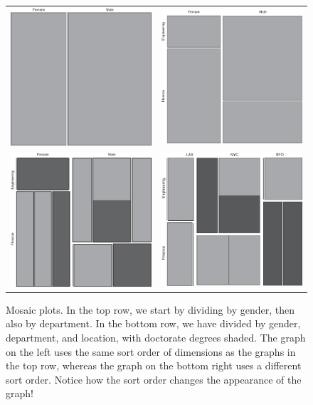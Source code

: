 \begin{figure}
  \begin{tabular}{@{\hskip-12pt}cc}
    \includegraphics[width=2.5in]{img/mosaic1} &
    \includegraphics[width=2.5in]{img/mosaic2} \\[6pt]
    \includegraphics[width=2.5in]{img/mosaic3} &
    \includegraphics[width=2.5in]{img/mosaic4} 
  \end{tabular}
  \caption{Mosaic plots. In the top row, we start by dividing by 
    gender, then also by department. In the bottom row, we have
    divided by gender, department, and location, with doctorate
    degrees shaded. The graph on the left uses the same sort order
    of dimensions as the graphs in the top row, whereas the graph
    on the bottom right uses a different sort order. Notice how
    the sort order changes the appearance of the graph!}
  \label{fig:mosaicplots}
\end{figure}

